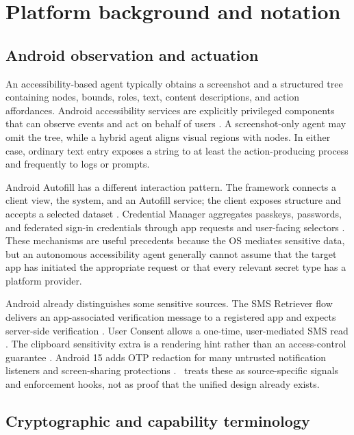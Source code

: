 \section{Platform background and notation}
\label{sec:preliminaries}

\subsection{Android observation and actuation}

An accessibility-based agent typically obtains a screenshot and a structured tree containing nodes, bounds, roles, text, content descriptions, and action affordances. Android accessibility services are explicitly privileged components that can observe events and act on behalf of users \cite{androidAccessibility}. A screenshot-only agent may omit the tree, while a hybrid agent aligns visual regions with nodes. In either case, ordinary text entry exposes a string to at least the action-producing process and frequently to logs or prompts.

Android Autofill has a different interaction pattern. The framework connects a client view, the system, and an Autofill service; the client exposes structure and accepts a selected dataset \cite{androidAutofill,androidAutofillServices}. Credential Manager aggregates passkeys, passwords, and federated sign-in credentials through app requests and user-facing selectors \cite{androidCredentialManager}. These mechanisms are useful precedents because the OS mediates sensitive data, but an autonomous accessibility agent generally cannot assume that the target app has initiated the appropriate request or that every relevant secret type has a platform provider.

Android already distinguishes some sensitive sources. The SMS Retriever flow delivers an app-associated verification message to a registered app and expects server-side verification \cite{androidSmsRetriever}. User Consent allows a one-time, user-mediated SMS read \cite{androidSmsConsent}. The clipboard sensitivity extra is a rendering hint rather than an access-control guarantee \cite{androidClipboard}. Android 15 adds OTP redaction for many untrusted notification listeners and screen-sharing protections \cite{android15privacy}. \SH\ treats these as source-specific signals and enforcement hooks, not as proof that the unified design already exists.

\subsection{Cryptographic and capability terminology}

